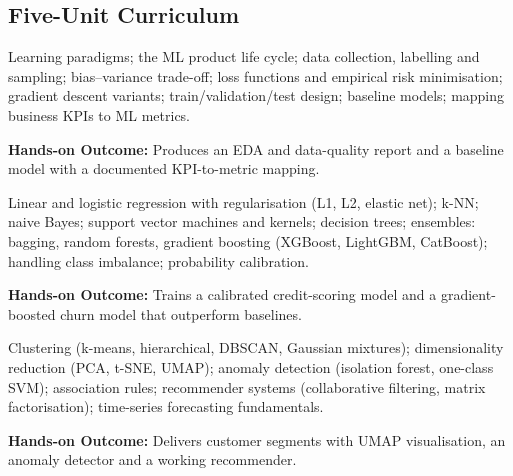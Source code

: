 \documentclass[10pt,a4paper]{article}
\begin{document}
\subsection*{Five-Unit Curriculum}
\begin{tcolorbox}[unitbox,title={{\color{gold}UNIT I}\quad ML Foundations and Problem Framing\hfill{\color{gold}9 Hours}}]\small Learning paradigms; the ML product life cycle; data collection, labelling and sampling; bias–variance trade-off; loss functions and empirical risk minimisation; gradient descent variants; train/validation/test design; baseline models; mapping business KPIs to ML metrics.\par\vspace{2pt}\par\textbf{Hands-on Outcome:} Produces an EDA and data-quality report and a baseline model with a documented KPI-to-metric mapping.\end{tcolorbox}
\begin{tcolorbox}[unitbox,title={{\color{gold}UNIT II}\quad Supervised Learning\hfill{\color{gold}9 Hours}}]\small Linear and logistic regression with regularisation (L1, L2, elastic net); k-NN; naive Bayes; support vector machines and kernels; decision trees; ensembles: bagging, random forests, gradient boosting (XGBoost, LightGBM, CatBoost); handling class imbalance; probability calibration.\par\vspace{2pt}\par\textbf{Hands-on Outcome:} Trains a calibrated credit-scoring model and a gradient-boosted churn model that outperform baselines.\end{tcolorbox}
\begin{tcolorbox}[unitbox,title={{\color{gold}UNIT III}\quad Unsupervised Learning and Representation\hfill{\color{gold}9 Hours}}]\small Clustering (k-means, hierarchical, DBSCAN, Gaussian mixtures); dimensionality reduction (PCA, t-SNE, UMAP); anomaly detection (isolation forest, one-class SVM); association rules; recommender systems (collaborative filtering, matrix factorisation); time-series forecasting fundamentals.\par\vspace{2pt}\par\textbf{Hands-on Outcome:} Delivers customer segments with UMAP visualisation, an anomaly detector and a working recommender.\end{tcolorbox}
\end{document}
